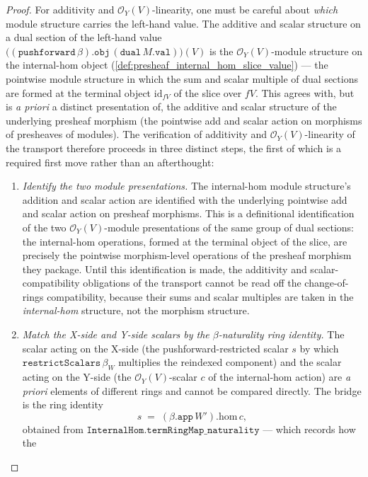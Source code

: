 \begin{proof}
  For additivity and \(\mathcal{O}_Y(V)\)-linearity, one must be careful about \emph{which}
  module structure carries the left-hand value. The additive and scalar structure on a dual
  section of the left-hand value
  \(\bigl((\mathtt{pushforward}\,\beta).\mathtt{obj}\,(\mathtt{dual}\,M.\mathtt{val})\bigr)(V)\)
  is the \(\mathcal{O}_Y(V)\)-module structure on the internal-hom object
  (\cref{def:presheaf_internal_hom_slice_value}) --- the pointwise module structure in which the
  sum and scalar multiple of dual sections are formed at the terminal object \(\mathrm{id}_{fV}\)
  of the slice over \(fV\). This agrees with, but is \emph{a priori} a distinct presentation of,
  the additive and scalar structure of the underlying presheaf morphism (the pointwise add and
  scalar action on morphisms of presheaves of modules). The verification of additivity and
  \(\mathcal{O}_Y(V)\)-linearity of the transport therefore proceeds in three distinct steps, the
  first of which is a required first move rather than an afterthought:
  \begin{enumerate}
    \item[(i)] \emph{Identify the two module presentations.} The internal-hom module structure's
      addition and scalar action are identified with the underlying pointwise add and scalar action
      on presheaf morphisms. This is a definitional identification of the two
      \(\mathcal{O}_Y(V)\)-module presentations of the same group of dual sections: the
      internal-hom operations, formed at the terminal object of the slice, are precisely the
      pointwise morphism-level operations of the presheaf morphism they package. Until this
      identification is made, the additivity and scalar-compatibility obligations of the transport
      cannot be read off the change-of-rings compatibility, because their sums and scalar multiples
      are taken in the \emph{internal-hom} structure, not the morphism structure.
    \item[(ii)] \emph{Match the X-side and Y-side scalars by the \(\beta\)-naturality ring
      identity.} The scalar acting on the X-side (the pushforward-restricted scalar \(s\) by
      which \(\mathtt{restrictScalars}\,\beta_W\) multiplies the reindexed component) and the
      scalar acting on the Y-side (the \(\mathcal{O}_Y(V)\)-scalar \(c\) of the internal-hom
      action) are \emph{a priori} elements of different rings and cannot be compared directly.
      The bridge is the ring identity
      \[
        s \;=\; (\beta.\mathtt{app}\,W').\mathrm{hom}\, c,
      \]
      obtained from \(\mathtt{InternalHom.termRingMap\_naturality}\) --- which records how the

\end{enumerate}
\end{proof}
